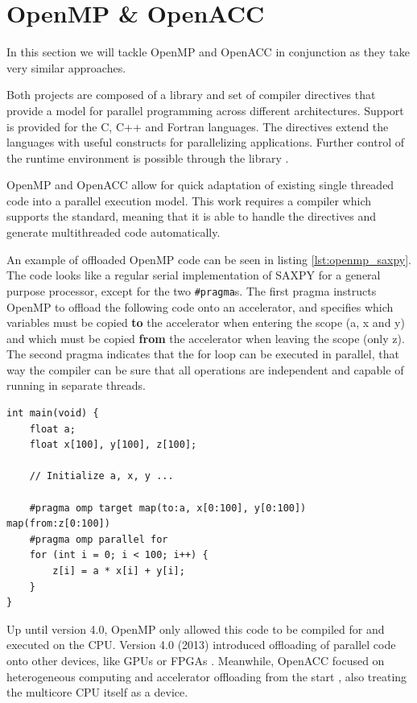 \section{OpenMP \& OpenACC}
In this section we will tackle OpenMP and OpenACC in conjunction as they take very similar approaches.

Both projects are composed of a library and set of compiler directives that provide a model for parallel programming across different architectures. Support is provided for the C, C++ and Fortran languages. The directives extend the languages with useful constructs for parallelizing applications. Further control of the runtime environment is possible through the library \cite{openmp_spec, openacc_spec}.

OpenMP and OpenACC allow for quick adaptation of existing single threaded code into a parallel execution model. This work requires a compiler which supports the standard, meaning that it is able to handle the directives and generate multithreaded code automatically.

An example of offloaded OpenMP code can be seen in listing \ref{lst:openmp_saxpy}. The code looks like a regular serial implementation of SAXPY for a general purpose processor, except for the two \texttt{\#pragma}s. The first pragma instructs OpenMP to offload the following code onto an accelerator, and specifies which variables must be copied \textbf{to} the accelerator when entering the scope (a, x and y) and which must be copied \textbf{from} the accelerator when leaving the scope (only z). The second pragma indicates that the for loop can be executed in parallel, that way the compiler can be sure that all operations are independent and capable of running in separate threads.

\begin{lstlisting}[style=CStyle, caption=OpenMP saxpy example, float, floatplacement=H, label={lst:openmp_saxpy}]
int main(void) {
    float a;
    float x[100], y[100], z[100];

    // Initialize a, x, y ...

    #pragma omp target map(to:a, x[0:100], y[0:100]) map(from:z[0:100])
    #pragma omp parallel for
    for (int i = 0; i < 100; i++) {
        z[i] = a * x[i] + y[i];
    }
}
\end{lstlisting}

Up until version 4.0, OpenMP only allowed this code to be compiled for and executed on the CPU. Version 4.0 (2013) introduced offloading of parallel code onto other devices, like GPUs or FPGAs \cite{openmp_gpu_support}. Meanwhile, OpenACC focused on heterogeneous computing and accelerator offloading from the start \cite{openacc_initial_spec}, also treating the multicore CPU itself as a device.

